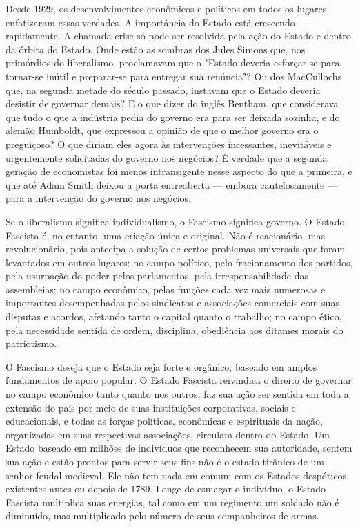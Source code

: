 \documentclass[12pt]{article}
\begin{document}
Desde 1929, os desenvolvimentos econômicos e políticos em todos os lugares enfatizaram essas verdades. A importância do Estado está crescendo rapidamente. A chamada crise só pode ser resolvida pela ação do Estado e dentro da órbita do Estado. Onde estão as sombras dos Jules Simons que, nos primórdios do liberalismo, proclamavam que o "Estado deveria esforçar-se para tornar-se inútil e preparar-se para entregar sua renúncia"? Ou dos MacCullochs que, na segunda metade do século passado, instavam que o Estado deveria desistir de governar demais? E o que dizer do inglês Bentham, que considerava que tudo o que a indústria pedia do governo era para ser deixada sozinha, e do alemão Humboldt, que expressou a opinião de que o melhor governo era o preguiçoso? O que diriam eles agora às intervenções incessantes, inevitáveis e urgentemente solicitadas do governo nos negócios? É verdade que a segunda geração de economistas foi menos intransigente nesse aspecto do que a primeira, e que até Adam Smith deixou a porta entreaberta — embora cautelosamente — para a intervenção do governo nos negócios.

Se o liberalismo significa individualismo, o Fascismo significa governo. O Estado Fascista é, no entanto, uma criação única e original. Não é reacionário, mas revolucionário, pois antecipa a solução de certos problemas universais que foram levantados em outros lugares: no campo político, pelo fracionamento dos partidos, pela usurpação do poder pelos parlamentos, pela irresponsabilidade das assembleias; no campo econômico, pelas funções cada vez mais numerosas e importantes desempenhadas pelos sindicatos e associações comerciais com suas disputas e acordos, afetando tanto o capital quanto o trabalho; no campo ético, pela necessidade sentida de ordem, disciplina, obediência aos ditames morais do patriotismo.

O Fascismo deseja que o Estado seja forte e orgânico, baseado em amplos fundamentos de apoio popular. O Estado Fascista reivindica o direito de governar no campo econômico tanto quanto nos outros; faz sua ação ser sentida em toda a extensão do país por meio de suas instituições corporativas, sociais e educacionais, e todas as forças políticas, econômicas e espirituais da nação, organizadas em suas respectivas associações, circulam dentro do Estado. Um Estado baseado em milhões de indivíduos que reconhecem sua autoridade, sentem sua ação e estão prontos para servir seus fins não é o estado tirânico de um senhor feudal medieval. Ele não tem nada em comum com os Estados despóticos existentes antes ou depois de 1789. Longe de esmagar o indivíduo, o Estado Fascista multiplica suas energias, tal como em um regimento um soldado não é diminuído, mas multiplicado pelo número de seus companheiros de armas.
\end{document}
